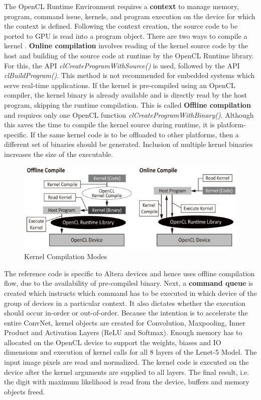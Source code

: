 The OpenCL Runtime Environment requires a \textbf{context} to manage memory, program, command issue, kernels, and program execution on the device for which the context is defined. Following the context creation, the source code to be ported to GPU is read into a program object.\newline\newline
There are two ways to compile a kernel \cite{opencl_book_html}. \textbf{Online compilation} involves reading of the kernel source code by the host and building of the source code at runtime by the OpenCL Runtime library. For this, the API \textit{clCreateProgramWithSource()} is used, followed by the API \textit{clBuildProgram()}. This method is not recommended for embedded systems which serve real-time applications. If the kernel is pre-compiled using an OpenCL compiler, the kernel binary is already available and is directly read by the host program, skipping the runtime compilation. This is called \textbf{Offline compilation} and requires only one OpenCL function \textit{clCreateProgramWithBinary()}. Although this saves the time to compile the kernel source during runtime, it is platform-specific. If the same kernel code is to be offloaded to other platforms, then a different set of binaries should be generated. Inclusion of multiple kernel binaries increases the size of the executable.
\begin{figure}[h!]
\centering
\includegraphics[width=0.7\linewidth]{figures/kernel_compilation.PNG}
\caption{Kernel Compilation Modes \cite{opencl_book_html}}
\label{fig:kernel_compilation}
\end{figure}
The reference code \cite{mnist-altera-opencl} is specific to Altera devices and hence uses offline compilation flow, due to the availability of pre-compiled binary.\newline\newline
Next, a \textbf{command queue} is created which instructs which command has to be executed in which device of the group of devices in a particular context. It also dictates whether the execution should occur in-order or out-of-order. Because the intention is to accelerate the entire ConvNet, kernel objects are created for Convolution, Maxpooling, Inner Product and Activation Layers (ReLU and Softmax). Enough memory has to allocated on the OpenCL device to support the weights, biases and IO dimensions and execution of kernel calls for all 8 layers of the Lenet-5 Model. \newline\newline
The input image pixels are read and normalized. The kernel code is executed on the device after the kernel arguments are supplied to all layers. The final result, i.e. the digit with maximum likelihood is read from the device, buffers and memory objects freed.
